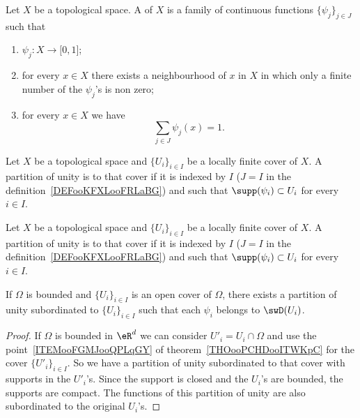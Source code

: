 \begin{definition}       \label{DEFooKFXLooFRLaBG}
	Let \( X\) be a topological space. A  of \( X\) is a family of continuous functions \( \{ \psi_j \}_{j\in J}\) such that
	\begin{enumerate}
		\item
		      \( \psi_j\colon X\to \mathopen[ 0 , 1 \mathclose]\);
		\item
		      for every \( x\in X\) there exists a neighbourhood of \( x\) in \( X\) in which only a finite number of the \( \psi_j\)'s is non zero;
		\item
		      for every \( x\in X\) we have
		      \begin{equation}
			      \sum_{j\in J}\psi_j(x)=1.
		      \end{equation}
	\end{enumerate}
\end{definition}


\begin{definition}
	Let \( X\) be a topological space and \( \{ U_i \}_{i\in I}\) be a locally finite cover of \( X\). A partition of unity is  to that cover if it is indexed by \( I\) (\( J=I\) in the definition~\ref{DEFooKFXLooFRLaBG}) and such that \( \supp(\psi_i)\subset U_i\) for every \( i\in I\).
\end{definition}

\begin{definition}
	Let \( X\) be a topological space and \( \{ U_i \}_{i\in I}\) be a locally finite cover of \( X\). A partition of unity is  to that cover if it is indexed by \( I\) (\( J=I\) in the definition~\ref{DEFooKFXLooFRLaBG}) and such that \( \supp(\psi_i)\subset U_i\) for every \( i\in I\).
\end{definition}


\begin{corollary}  \label{CORooMSWPooCxvuhm}
	If \( \Omega\) is bounded and \( \{U_i \}_{i\in I}\) is an open cover of \( \Omega\), there exists a partition of unity subordinated to \( \{ U_i \}_{i\in I}\) such that each \( \psi_i\) belongs to \( \swD(U_i)\).
\end{corollary}

\begin{proof}
	If \( \Omega\) is bounded in \( \eR^d\) we can consider \( U'_i=U_i\cap \Omega\) and use the point~\ref{ITEMooFGMJooQPLqGY} of theorem~\ref{THOooPCHDooITWKpC} for the cover \( \{ U'_i \}_{i\in I}\). So we have a partition of unity subordinated to that cover with supports in the \( U'_i\)'s. Since the support is closed and the \( U_i\)'s are bounded, the supports are compact. The functions of this partition of unity are also subordinated to the original \( U_i\)'s.
\end{proof}

